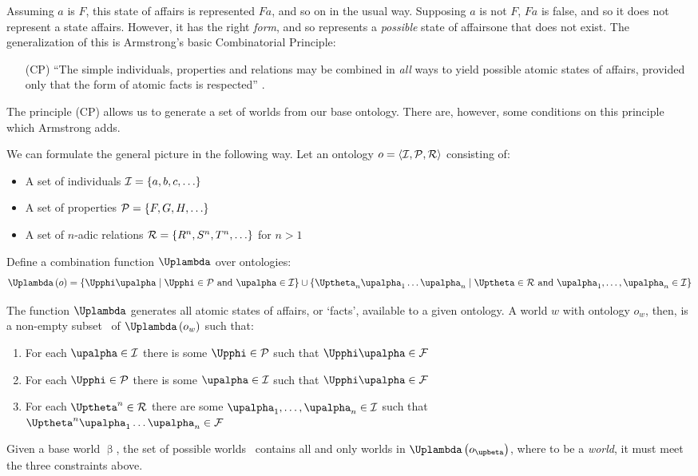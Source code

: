 Assuming $a$ is $F$, this state of affairs is represented $Fa$, and so on in the usual way. Supposing $a$ is not $F$, $Fa$ is false, and so it does not represent a state affairs. However, it has the right \emph{form}, and so represents a \emph{possible} state of affairs\textemdash one that does not exist. The generalization of this is Armstrong's basic Combinatorial Principle:

\begin{enumerate}
\item[(CP)] ``The simple individuals, properties and relations may be combined in \emph{all} ways to yield possible atomic states of affairs, provided only that the form of atomic facts is respected'' \citeyear[p. 579]{Armstrong:89}.
\end{enumerate}

\noindent The principle (CP) allows us to generate a set of worlds from our base ontology. There are, however, some conditions on this principle which Armstrong adds. 

We can formulate the general picture in the following way. Let an ontology $o=\langle {\ensuremath{\mathcal{I}},\ensuremath{\mathcal{P}},\ensuremath{\mathcal{R}}}\rangle$ consisting of:

\begin{singlespace}
\begin{itemize}
	\item A set of individuals $\mathcal{I}=\left\{{a,b,c,\dots}\right\}$
	\item A set of properties $\mathcal{P}=\left\{{F,G,H,\dots}\right\}$
	\item A set of $n$-adic relations $\mathcal{R}=\left\{{R^n,S^n,T^n,\dots}\right\}$ for $n>1$
\end{itemize}
\end{singlespace}
\noindent Define a combination function $\Uplambda$ over ontologies:
\[ \Uplambda\left(o\right) = \set{\Upphi\upalpha\st\Upphi\in\Props \mbox{ and } \upalpha\in\Inds} \cup \set{\Uptheta_n\upalpha_1\dots\upalpha_n\st\Uptheta\in\Rels \mbox{ and } \upalpha_1,\dots,\upalpha_n\in\Inds} \]

\noindent The function $\Uplambda$ generates all atomic states of affairs, or `facts', available to a given ontology. A world $w$ with ontology $o_w$, then, is a non-empty subset \Facts\ of $\Uplambda\left(o_w\right)$ such that:

\begin{singlespace}	
	\begin{enumerate}
		\item For each $\upalpha\in\Inds$ there is some $\Upphi\in\Props$ such that $\Upphi\upalpha\in\Facts$
		\item For each $\Upphi\in\Props$ there is some $\upalpha\in\Inds$ such that $\Upphi\upalpha\in\Facts$
		\item For each $\Uptheta^n\in\Rels$ there are some $\upalpha_1,\dots,\upalpha_n\in\Inds$ such that \\ $\Uptheta^n\upalpha_1\dots\upalpha_n\in\Facts$
	\end{enumerate}
\end{singlespace}
\noindent Given a base world $\upbeta$, the set of possible worlds \Worlds\ contains all and only worlds in $\Uplambda\left(o_\upbeta\right)$, where to be a \emph{world}, it must meet the three constraints above. 

